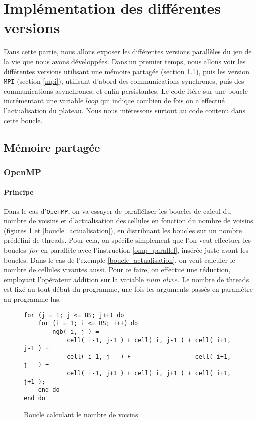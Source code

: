 \section{Implémentation des différentes versions} %
\label{sec:diff_rents_versions}
Dans cette partie, nous allons exposer les différentes versions parallèles du jeu de la vie que nous avons développées. Dans un premier temps, nous allons voir les différentes versions utilisant une mémoire partagée (section \ref{partagee}), puis les version \texttt{MPI} (section \ref{mpi}), utilisant d'abord des communications synchrones, puis des communications asynchrones, et enfin persistantes. Le code itère sur une boucle incrémentant une variable $loop$ qui indique combien de fois on a effectué l'actualisation du plateau. Nous nous intéressons surtout au code contenu dans cette boucle.

\subsection{Mémoire partagée}
\label{partagee}

\subsubsection{OpenMP}
\label{openmp}
\paragraph{Principe}
Dans le cas d'\texttt{OpenMP}, on va essayer de paralléliser les boucles de calcul du nombre de voisins et d'actualisation des cellules en fonction du nombre de voisins (figures \ref{boucle_voisins} et \ref{boucle_actualisation}), en distribuant les boucles sur un nombre prédéfini de threads. Pour cela, on spécifie simplement que l'on veut effectuer les boucles $for$ en parallèle avec l'instruction \ref{omp_parallel}, insérée juste avant les boucles. Dans le cas de l'exemple \ref{boucle_actualisation}, on veut calculer le nombre de cellules vivantes aussi. Pour ce faire, on effectue une réduction, employant l'opérateur addition sur la variable $num\_alive$. Le nombre de threads est fixé au tout début du programme, une fois les arguments passés en paramètre au programme lus. 

\begin{figure}[!ht]
\begin{lstlisting}
for (j = 1; j <= BS; j++) do
	for (i = 1; i <= BS; i++) do
		ngb( i, j ) =
			cell( i-1, j-1 ) + cell( i, j-1 ) + cell( i+1, j-1 ) +
			cell( i-1, j   ) +                  cell( i+1, j   ) +
			cell( i-1, j+1 ) + cell( i, j+1 ) + cell( i+1, j+1 );
	end do
end do
\end{lstlisting}
\caption{Boucle calculant le nombre de voisins}
\label{boucle_voisins}
\end{figure}


